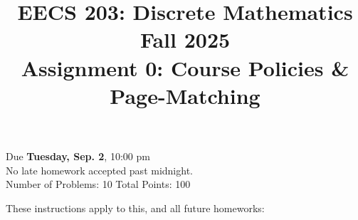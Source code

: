 \documentclass[12pt]{exam}
\begin{document}
\title{EECS 203: Discrete Mathematics\\
  Fall 2025\\
  Assignment 0: Course Policies \& Page-Matching}
\date{}\author{}
\maketitle
\vspace{-55pt}
\begin{center}
  \huge Due \textbf{Tuesday, Sep. 2}, 10:00 pm\\
\Large No late homework accepted past midnight.\\
\vspace{10pt}
\large Number of Problems: 10
\hspace{3cm}
Total Points: 100
\end{center}
\vspace{20pt}
These instructions apply to this, and all future homeworks:
\end{document}
